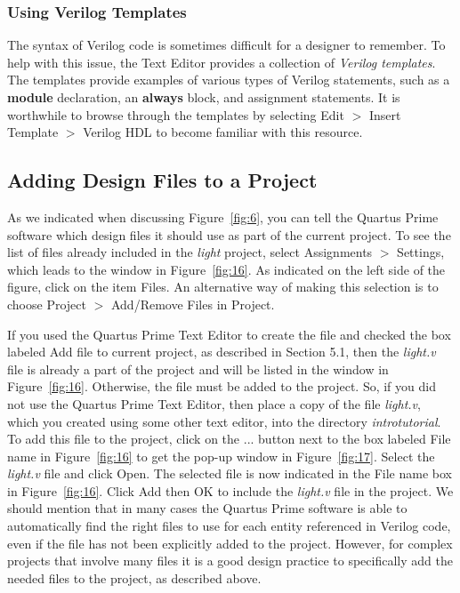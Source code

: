 \subsubsection{Using Verilog Templates}

The syntax of Verilog code is sometimes difficult for a
designer to remember. To help with this issue, the Text Editor
provides a collection of {\it Verilog templates}. The templates provide
examples of various types of Verilog statements, such as a {\bf module}
declaration, an {\bf always} block, and assignment statements. 
It is worthwhile to browse through the templates
by selecting {\sf Edit $>$ Insert Template $>$ Verilog HDL} to become 
familiar with this resource.

\subsection{Adding Design Files to a Project}

As we indicated when discussing Figure~\ref{fig:6}, you can tell the Quartus Prime software
which design files it should use as part of the current project.
To see the list of files already included in the {\it light} project,
select {\sf Assignments $>$ Settings}, which leads to the window in Figure~\ref{fig:16}.
As indicated on the left side of the figure, click on the item {\sf Files}.
An alternative way of making this selection is to choose
{\sf Project $>$ Add/Remove Files in Project}.

If you used the Quartus Prime Text Editor to create the file and checked
the box labeled {\sf Add file to current project},
as described in Section 5.1, then the {\it light.v}
file is already a part of the project and will be listed in
the window in Figure~\ref{fig:16}.
Otherwise, the file must be added to the project. 
So, if you did not use the Quartus Prime Text Editor, then place a copy of the 
file {\it light.v}, which you created using some other text editor, into 
the directory {\it introtutorial}.
To add this file to the project, click on the {\sf ...} button next to the 
box labeled {\sf File name} in
Figure~\ref{fig:16} to get the pop-up window in Figure~\ref{fig:17}.
Select the {\it light.v} file and click {\sf Open}.
The selected file is now indicated in the {\sf File name} box in Figure~\ref{fig:16}. 
Click {\sf Add} then {\sf OK} to include the {\it light.v} file in the project.
We should mention that in many cases the Quartus Prime software is able to 
automatically find the right files to use for each entity 
referenced in Verilog code, even if the file has not been 
explicitly added to the project. However, for complex projects that
involve many files it is a good design practice to specifically
add the needed files to the project, as described above.


